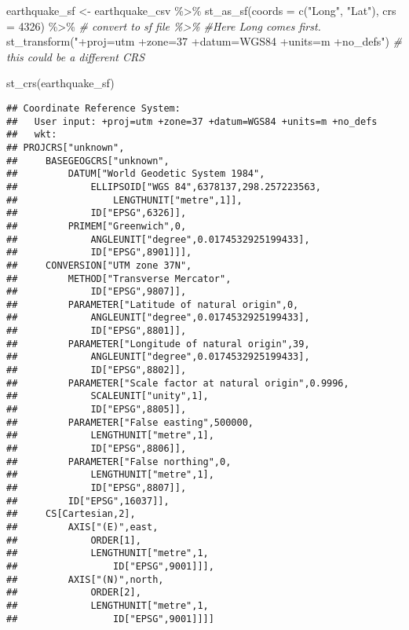 \documentclass[
]{book}
\newenvironment{Shaded}{\begin{snugshade}}{\end{snugshade}}
\newcommand{\AttributeTok}[1]{\textcolor[rgb]{0.77,0.63,0.00}{#1}}
\newcommand{\CommentTok}[1]{\textcolor[rgb]{0.56,0.35,0.01}{\textit{#1}}}
\newcommand{\DecValTok}[1]{\textcolor[rgb]{0.00,0.00,0.81}{#1}}
\newcommand{\FunctionTok}[1]{\textcolor[rgb]{0.00,0.00,0.00}{#1}}
\newcommand{\NormalTok}[1]{#1}
\newcommand{\OtherTok}[1]{\textcolor[rgb]{0.56,0.35,0.01}{#1}}
\newcommand{\SpecialCharTok}[1]{\textcolor[rgb]{0.00,0.00,0.00}{#1}}
\newcommand{\StringTok}[1]{\textcolor[rgb]{0.31,0.60,0.02}{#1}}
\begin{document}
\begin{Shaded}
\begin{Highlighting}[]
\NormalTok{earthquake\_sf }\OtherTok{\textless{}{-}}\NormalTok{ earthquake\_csv }\SpecialCharTok{\%\textgreater{}\%} 
  \FunctionTok{st\_as\_sf}\NormalTok{(}\AttributeTok{coords =} \FunctionTok{c}\NormalTok{(}\StringTok{"Long"}\NormalTok{, }\StringTok{"Lat"}\NormalTok{), }\AttributeTok{crs =} \DecValTok{4326}\NormalTok{)  }\SpecialCharTok{\%\textgreater{}\%}      \CommentTok{\# convert to sf file \%\textgreater{}\%}
  \CommentTok{\#Here Long comes first.}
  \FunctionTok{st\_transform}\NormalTok{(}\StringTok{"+proj=utm +zone=37 +datum=WGS84 +units=m +no\_defs"}\NormalTok{)                                        }\CommentTok{\# this could be a different CRS}

\FunctionTok{st\_crs}\NormalTok{(earthquake\_sf)}
\end{Highlighting}
\end{Shaded}

\begin{verbatim}
## Coordinate Reference System:
##   User input: +proj=utm +zone=37 +datum=WGS84 +units=m +no_defs 
##   wkt:
## PROJCRS["unknown",
##     BASEGEOGCRS["unknown",
##         DATUM["World Geodetic System 1984",
##             ELLIPSOID["WGS 84",6378137,298.257223563,
##                 LENGTHUNIT["metre",1]],
##             ID["EPSG",6326]],
##         PRIMEM["Greenwich",0,
##             ANGLEUNIT["degree",0.0174532925199433],
##             ID["EPSG",8901]]],
##     CONVERSION["UTM zone 37N",
##         METHOD["Transverse Mercator",
##             ID["EPSG",9807]],
##         PARAMETER["Latitude of natural origin",0,
##             ANGLEUNIT["degree",0.0174532925199433],
##             ID["EPSG",8801]],
##         PARAMETER["Longitude of natural origin",39,
##             ANGLEUNIT["degree",0.0174532925199433],
##             ID["EPSG",8802]],
##         PARAMETER["Scale factor at natural origin",0.9996,
##             SCALEUNIT["unity",1],
##             ID["EPSG",8805]],
##         PARAMETER["False easting",500000,
##             LENGTHUNIT["metre",1],
##             ID["EPSG",8806]],
##         PARAMETER["False northing",0,
##             LENGTHUNIT["metre",1],
##             ID["EPSG",8807]],
##         ID["EPSG",16037]],
##     CS[Cartesian,2],
##         AXIS["(E)",east,
##             ORDER[1],
##             LENGTHUNIT["metre",1,
##                 ID["EPSG",9001]]],
##         AXIS["(N)",north,
##             ORDER[2],
##             LENGTHUNIT["metre",1,
##                 ID["EPSG",9001]]]]
\end{verbatim}
\end{document}
